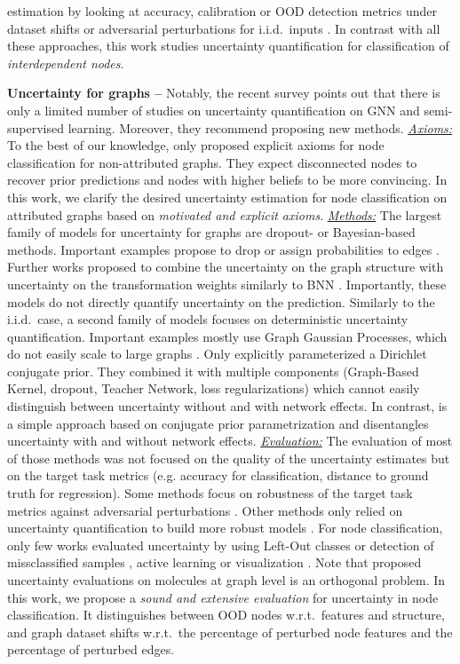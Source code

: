 estimation by looking at accuracy, calibration or OOD detection metrics under dataset shifts or adversarial perturbations for i.i.d.\ inputs \citep{Ovadia2019, robustness-uncertainty-dirichlet}. In contrast with all these approaches, this work studies uncertainty quantification for classification of \emph{interdependent nodes}.

\textbf{Uncertainty for graphs -- } Notably, the recent survey \citep{Abdar2020} points out that there is only a limited number of studies on uncertainty quantification on GNN and semi-supervised learning. Moreover, they recommend proposing new methods. \emph{\underline{Axioms:}} To the best of our knowledge, only \citep{Eswaran2017} proposed explicit axioms for node classification for non-attributed graphs. They expect disconnected nodes to recover prior predictions and nodes with higher beliefs to be more convincing. In this work, we clarify the desired uncertainty estimation for node classification on attributed graphs based on \emph{motivated and explicit axioms}. \emph{\underline{Methods:}} The largest family of models for uncertainty for graphs are dropout- or Bayesian-based methods. Important examples propose to drop or assign probabilities to edges \citep{Rong2019, Chen2018, Hasanzadeh2020, Dallachiesa2014, Hu2017}. Further works proposed to combine the uncertainty on the graph structure with uncertainty on the transformation weights similarly to BNN \citep{Elinas2019, Zhang2019b, Pal2019a, Pal2019b}. Importantly, these models do not directly quantify uncertainty on the prediction. Similarly to the i.i.d.\ case, a second family of models focuses on deterministic uncertainty quantification. Important examples mostly use Graph Gaussian Processes, which do not easily scale to large graphs \citep{Ng2018, Zhi2020, Liu2020c, Borovitskiy2020}. Only \citep{Zhao2020} explicitly parameterized a Dirichlet conjugate prior. They combined it with multiple components (Graph-Based Kernel, dropout, Teacher Network, loss regularizations) which cannot easily distinguish between uncertainty without and with network effects. In contrast, \GPNacro{} is a simple approach based on conjugate prior parametrization and disentangles uncertainty with and without network effects. \emph{\underline{Evaluation:}} The evaluation of most of those methods was not focused on the quality of the uncertainty estimates but on the target task metrics (e.g. accuracy for classification, distance to ground truth for regression). Some methods focus on robustness of the target task metrics against adversarial perturbations \citep{GNNBook-ch8-gunnemann, zugner2018adversarial, zugner2019adversarial}. Other methods only relied on uncertainty quantification to build more robust models \citep{Zhu2019, Feng2020}. For node classification, only few works evaluated uncertainty by using Left-Out classes or detection of missclassified samples \citep{Zhao2020}, active learning \cite{Ng2018} or visualization \citep{Borovitskiy2020}. Note that proposed uncertainty evaluations on molecules at graph level \citep{Zhang2019, Ryu2019, Akita2018, uncertainty-nn-molecules, uncertainty-material-prediction} is an orthogonal problem. In this work, we propose a \emph{sound and extensive evaluation} for uncertainty in node classification. It distinguishes between OOD nodes w.r.t.\ features and structure, and graph dataset shifts w.r.t.\ the percentage of perturbed node features and the percentage of perturbed edges.
